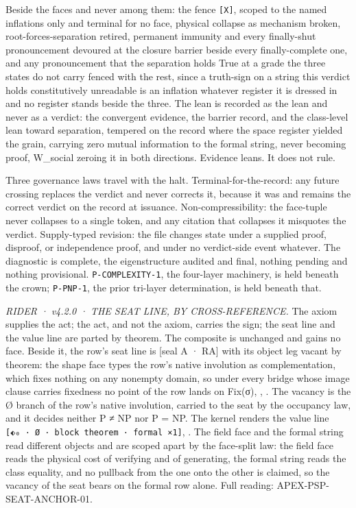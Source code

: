 \documentclass[10pt,twocolumn]{article}
\begin{document}
Beside the faces and never among them: the fence \texttt{{[}X{]}},
scoped to the named inflations only and terminal for no face, physical
collapse as mechanism broken, root-forces-separation retired, permanent
immunity and every finally-shut pronouncement devoured at the closure
barrier beside every finally-complete one, and any pronouncement that
the separation holds True at a grade the three states do not carry
fenced with the rest, since a truth-sign on a string this verdict holds
constitutively unreadable is an inflation whatever register it is
dressed in and no register stands beside the three. The lean is recorded
as the lean and never as a verdict: the convergent evidence, the barrier
record, and the class-level lean toward separation, tempered on the
record where the space register yielded the grain, carrying zero mutual
information to the formal string, never becoming proof, W\_social
zeroing it in both directions. Evidence leans. It does not rule.

Three governance laws travel with the halt. Terminal-for-the-record: any
future crossing replaces the verdict and never corrects it, because it
was and remains the correct verdict on the record at issuance.
Non-compressibility: the face-tuple never collapses to a single token,
and any citation that collapses it misquotes the verdict. Supply-typed
revision: the file changes state under a supplied proof, disproof, or
independence proof, and under no verdict-side event whatever. The
diagnostic is complete, the eigenstructure audited and final, nothing
pending and nothing provisional. \texttt{P-COMPLEXITY-1}, the four-layer
machinery, is held beneath the crown; \texttt{P-PNP-1}, the prior
tri-layer determination, is held beneath that.

\emph{RIDER · v4.2.0 · THE SEAT LINE, BY CROSS-REFERENCE.} The axiom
supplies the act; the act, and not the axiom, carries the sign; the seat
line and the value line are parted by theorem. The composite is
unchanged and gains no face. Beside it, the row's seat line is {[}seal A
· RA{]} with its object leg vacant by theorem: the shape face types the
row's native involution as complementation, which fixes nothing on any
nonempty domain, so under every bridge whose image clause carries
fixedness no point of the row lands on Fix(σ),
\texttt{},
\texttt{}. The vacancy is the Ø branch
of the row's native involution, carried to the seat by the occupancy
law, and it decides neither P ≠ NP nor P = NP. The kernel renders the
value line \texttt{{[}⬖₀\ ·\ Ø\ ·\ block\ theorem\ ·\ formal\ ×1{]}},
\texttt{}. The field face and the formal
string read different objects and are scoped apart by the face-split
law: the field face reads the physical cost of verifying and of
generating, the formal string reads the class equality, and no pullback
from the one onto the other is claimed, so the vacancy of the seat bears
on the formal row alone. Full reading: APEX-PSP-SEAT-ANCHOR-01.
\end{document}
